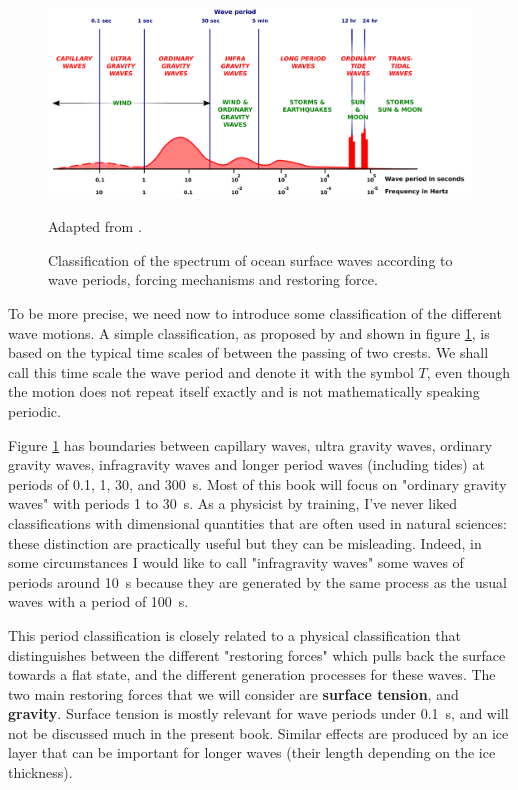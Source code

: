 \begin{figure}[htb]
\centerline{\includegraphics[width=\textwidth]{FIGS_CH_INTRO/Munk_ICCE_1950_Fig1.pdf}}
  \caption{Classification of the spectrum of ocean surface waves according to wave periods, forcing mechanisms and restoring force.}{Adapted from \cite{Munk1950}.}
\label{fig:Munk1950}
\end{figure}
To be more precise, we need now to introduce some classification of the different wave motions. A simple classification, as proposed by 
\cite{Munk1950} and shown in figure \ref{fig:Munk1950}, is based on the typical time scales of between the passing of two crests. We shall call this time scale the wave period and denote it with the symbol $T$, even though the motion does not repeat itself exactly and is not mathematically speaking periodic. 

Figure \ref{fig:Munk1950} has boundaries between capillary waves, ultra gravity waves, ordinary gravity waves, infragravity waves and longer period waves (including tides) at periods of 0.1, 1, 30, and 300~s. Most of this book will focus on "ordinary gravity waves" with periods 1 to 30~s. As a physicist by training, I've never liked classifications with dimensional quantities that are often used in natural sciences: these distinction are practically useful but they can be misleading.  Indeed, in some circumstances I would like to call "infragravity waves" some waves of periods around 10~s because they are generated by the same process as the usual waves with a period of 100~s. 

This period classification is closely related to a physical classification that distinguishes 
between the different  "restoring forces" which pulls back the surface towards a flat state, and the different generation processes for these waves. 
The two main restoring forces that we will consider are  \textbf{surface tension}, and \textbf{gravity}. Surface tension is mostly relevant for wave periods under 0.1~s, and will not be discussed much in the present book. Similar effects are produced by an ice layer that can be important for longer waves (their length depending on the ice thickness).

